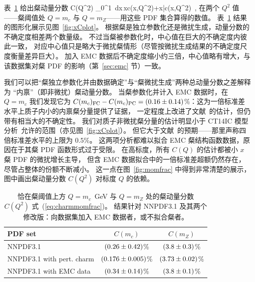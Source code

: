 表~\ref{tab:momsr} 给出粲动量分数
\be
\label{eq:charmmomfrac}
C(Q^2) \equiv \int_0^1\, dx\,\lp xc(x,Q^2)+x\bar{c}(x,Q^2)\rp \ ,
\ee
在两个 $Q^2$ 值——粲阈值处 $Q=m_c$ 与 $Q=m_Z$——用这些 PDF 集合算得的数值。
表~\ref{tab:momsr} 结果的图形化展示见图~\ref{fig:xCplot}。
根据粲是独立参数化还是微扰生成，动量分数的不确定度相差两个数量级。
不过当粲被参数化时，中心值在巨大的不确定度内彼此一致，
对应中心值只是略大于微扰粲情形（尽管按微扰生成结果的不确定度尺度衡量差异巨大）。
加入 EMC 数据后不确定度缩小约三倍，中心值略有增大，与该数据集对粲 PDF 的影响（第~\ref{sec:emc} 节）一致。

我们可以把“粲独立参数化并由数据确定”与“粲微扰生成”两种总动量分数之差解释为
“内禀”（即非微扰）粲动量分数。
当粲参数化并计入 EMC 数据时，在 $Q=m_c$ 我们发现它为
$C(m_c)_{\rm FC}-C(m_c)_{\rm PC} =  \left(0.16 \pm 0.14\right)$\%：这为一倍标准差水平上质子内小的内禀粲分量提供了证据，
一定程度上改进了文献~\cite{Ball:2016neh}的估计，但仍带有相当大的不确定性。
%
我们对质子非微扰粲分量的估计明显小于 CT14IC 模型分析~\cite{Dulat:2013hea}允许的范围（亦见图~\ref{fig:xCplot}）。
但它大于文献~\cite{Jimenez-Delgado:2014zga}的预期——那里声称四倍标准差水平的上限为 $0.5$\%。
这两项分析都难以拟合 EMC 粲结构函数数据，原因在于其粲 PDF 函数形式过于受限。
在高标度，所有 $C(Q)$ 的估计都被小 $x$ 粲 PDF 的微扰增长主导，
但含 EMC 数据拟合中的一倍标准差超额仍然存在，尽管占整体的份额不断减小。
这一点在图~\ref{fig:momfrac} 中得到非常清楚的展示，图中画出粲动量分数 $C(Q^2)$ 对标度 $Q$ 的依赖。


\begin{table}[t]
  \center
   \renewcommand{\arraystretch}{1.4}
  \begin{tabular}{|l|c|c|}
    \hline
    PDF set & $C(m_c)$ & $C(m_Z)$ \\
    \hline
    \hline
    NNPDF3.1           & $\left( 0.26 \pm 0.42\right) $\%  &  $\left( 3.8 \pm 0.3\right) $\%\\
    NNPDF3.1 with pert. charm        & $\left( 0.176 \pm 0.005\right) $\%  &  $\left( 3.73 \pm 0.02\right) $\% \\
    NNPDF3.1 with EMC data  &   $\left( 0.34 \pm 0.14\right) $\% & $\left( 3.8  \pm 0.1\right) $\% \\
          \hline
  \end{tabular}
  \caption{\small \label{tab:momsr}
    恰在粲阈值上方 $Q=m_c$~GeV 与 $Q=m_Z$ 处的粲动量分数 $C(Q^2)$ 式~(\ref{eq:charmmomfrac})。
    结果针对 NNPDF3.1 及其两个修改版：向数据集加入 EMC 数据者，或不拟合粲者。
  }
  \end{table}

